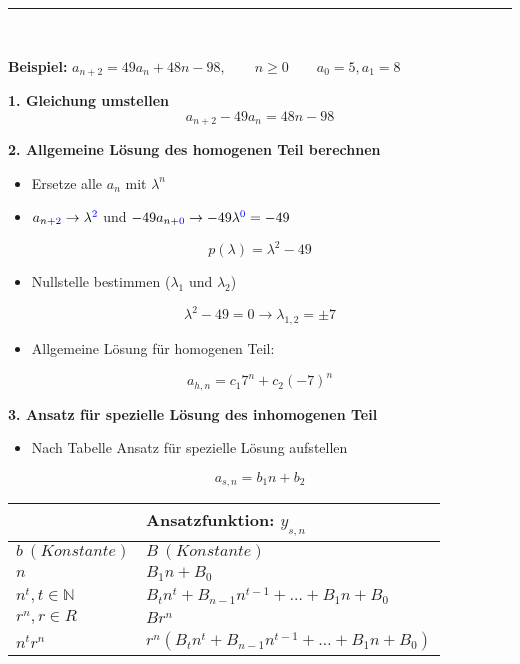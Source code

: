 \hrule\

\newpage

\textbf{Beispiel:} $a_{n+2} = 49 a_n + 48n - 98, \qquad n \geq 0 \qquad a_0 = 5, a_1 = 8$

\textbf{1. Gleichung umstellen}
$$
a_{n+2} - 49a_n = 48n - 98
$$

\textbf{2. Allgemeine Lösung des homogenen Teil berechnen}

\begin{itemize}
\item Ersetze alle $a_n$ mit $\lambda ^n$
\item $a_{n+{\color{blue}2}} \rightarrow \lambda ^{\color{blue}2}$ und $-49a_{n+{\color{blue}0}} \rightarrow -49 \lambda ^{{\color{blue}0}} = -49$
\end{itemize}
$$
p(\lambda) =  \lambda ^2 - 49
$$

\begin{itemize}
\item Nullstelle bestimmen ($\lambda _1$ und $\lambda _2$)
\end{itemize}
$$
\lambda ^2 - 49 = 0 \rightarrow \lambda _{1,2} = \pm 7
$$

\begin{itemize}
\item Allgemeine Lösung für homogenen Teil:
\end{itemize}
$$
\boxed{a_{h,n} = c_1 7^n + c_2 (-7)^n}
$$

\textbf{3. Ansatz für spezielle Lösung des inhomogenen Teil}

\begin{itemize}
\item Nach Tabelle Ansatz für spezielle Lösung aufstellen
\end{itemize}

$$
a_{s,n} = b_1 n + b_2
$$

\begin{table}[h]
\renewcommand{\arraystretch}{1.5}
\begin{tabular}{l|l}
& Ansatzfunktion: $y_{s,n}$\\
\hline
$b \ (Konstante)$ & $B \ (Konstante)$\\
$n$ & $B_1 n + B_0$\\
$n^t, t \in \mathbb{N}$ & $B_t n^t + B_{n-1} n^{t-1} + \dots + B_1 n + B_0$\\
$r^n, r \in R$ & $Br^n$\\
$n^t r^n$ & $r^n (B_t n^t + B_{n-1} n^{t-1} + \dots + B_1 n + B_0)$
\end{tabular}
\end{table}

